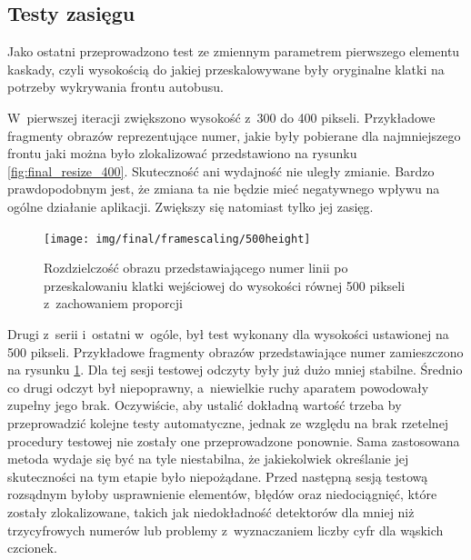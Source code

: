 \subsection{Testy zasięgu}

Jako ostatni przeprowadzono test
ze zmiennym parametrem pierwszego elementu kaskady, czyli wysokością
do jakiej przeskalowywane były oryginalne klatki na potrzeby wykrywania
frontu autobusu.

W~pierwszej iteracji zwiększono wysokość z~300 do 400 pikseli. 
Przykładowe fragmenty obrazów reprezentujące numer, jakie były
pobierane dla najmniejszego frontu jaki można było zlokalizować
przedstawiono na rysunku \ref{fig:final_resize_400}.
Skuteczność ani wydajność nie uległy zmianie. Bardzo prawdopodobnym jest,
że zmiana ta nie będzie mieć negatywnego wpływu na ogólne działanie 
aplikacji. Zwiększy się natomiast tylko jej zasięg.

\begin{figure}[h!]
	\centering
	\texttt{[image: img/final/framescaling/500height]}
	\caption{Rozdzielczość obrazu przedstawiającego numer linii po
		przeskalowaniu klatki wejściowej do wysokości równej 500 pikseli 
		z~zachowaniem proporcji}
	\label{fig:final_resize_500}
\end{figure}

Drugi z~serii i~ostatni w~ogóle, był test wykonany dla wysokości
ustawionej na 500 pikseli. Przykładowe fragmenty obrazów
przedstawiające numer zamieszczono na rysunku \ref{fig:final_resize_500}.
Dla tej sesji testowej odczyty były już dużo mniej stabilne.
Średnio co drugi odczyt był niepoprawny, a~niewielkie ruchy aparatem
powodowały zupełny jego brak. Oczywiście, aby ustalić dokładną wartość trzeba
by przeprowadzić kolejne testy automatyczne, jednak ze względu na brak
rzetelnej procedury testowej nie zostały one przeprowadzone ponownie.
Sama zastosowana metoda wydaje się być na tyle niestabilna, że
jakiekolwiek określanie jej skuteczności na tym etapie było niepożądane.
Przed następną sesją testową rozsądnym byłoby usprawnienie
elementów, błędów oraz niedociągnięć, które zostały zlokalizowane, takich
jak niedokładność detektorów dla mniej niż trzycyfrowych numerów
lub problemy z~wyznaczaniem liczby cyfr dla wąskich czcionek. 

